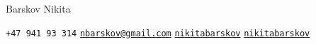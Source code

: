     \begin{center}
    \huge Barskov Nikita

    \normalsize
    \faPhone \texttt{+47 941 93 314}
    \faEnvelope \href{mailto:nbarskov@gmail.com}{\texttt{nbarskov@gmail.com}}
    \faGithub \href{https://github.com/nikitabarskov}{\texttt{nikitabarskov}}
    \faLinkedin \href{https://linkedin.com/in/nikitabarskov}{\texttt{nikitabarskov}}
    \end{center}
